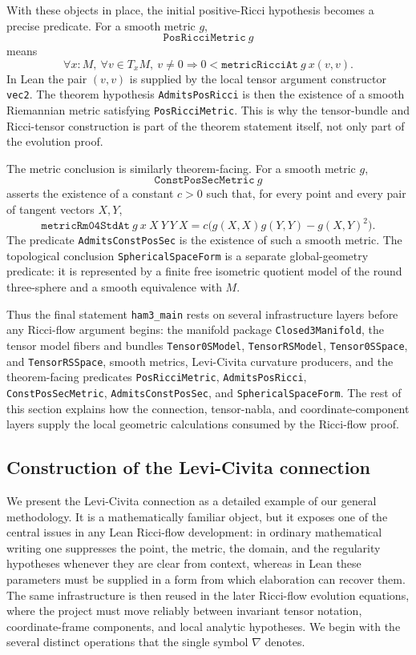 \documentclass[11pt]{article}
\theoremstyle{plain}
\theoremstyle{definition}
\theoremstyle{remark}
\newcommand{\leanref}[1]{\nolinkurl{#1}}
\begin{document}
With these objects in place, the initial positive-Ricci hypothesis becomes a
precise predicate.  For a smooth metric \(g\),
\[
  \mathtt{PosRicciMetric}\ g
\]
means
\[
  \forall x:M,\ \forall v\in T_xM,\ v\ne0
  \Longrightarrow
  0 <
  \mathtt{metricRicciAt}\ g\ x(v,v).
\]
In Lean the pair \((v,v)\) is supplied by the local tensor argument constructor
\leanref{vec2}.  The theorem hypothesis
\leanref{AdmitsPosRicci} is then the existence of a smooth Riemannian metric satisfying
\leanref{PosRicciMetric}.  This is why the tensor-bundle and Ricci-tensor
construction is part of the theorem statement itself, not only part of the
evolution proof.

The metric conclusion is similarly theorem-facing.  For a smooth metric \(g\),
\[
  \mathtt{ConstPosSecMetric}\ g
\]
asserts the existence of a constant \(c>0\) such that, for every point and every
pair of tangent vectors \(X,Y\),
\[
  \mathtt{metricRm04StdAt}\ g\ x\ X\ Y\ Y\ X
  =
  c\bigl(
      g(X,X)g(Y,Y)-g(X,Y)^2
    \bigr).
\]
The predicate \leanref{AdmitsConstPosSec} is the existence of such a smooth
metric.  The topological conclusion \leanref{SphericalSpaceForm} is a separate
global-geometry predicate: it is represented by a finite free isometric
quotient model of the round three-sphere and a smooth equivalence with \(M\).

Thus the final statement \leanref{ham3_main} rests on several infrastructure
layers before any Ricci-flow argument begins:
the manifold package \leanref{Closed3Manifold}, the tensor model fibers and
bundles \leanref{Tensor0SModel}, \leanref{TensorRSModel},
\leanref{Tensor0SSpace}, and \leanref{TensorRSSpace}, smooth metrics,
Levi-Civita curvature producers, and the theorem-facing predicates
\leanref{PosRicciMetric}, \leanref{AdmitsPosRicci},
\leanref{ConstPosSecMetric}, \leanref{AdmitsConstPosSec}, and
\leanref{SphericalSpaceForm}.  The rest of this section explains how the
connection, tensor-nabla, and coordinate-component layers supply the local
geometric calculations consumed by the Ricci-flow proof.

\subsection{Construction of the Levi-Civita connection}

We present the Levi-Civita connection as a detailed example of our general
methodology.  It is a mathematically familiar object, but it exposes one of the
central issues in any Lean Ricci-flow development: in ordinary mathematical
writing one suppresses the point, the metric, the domain, and the regularity
hypotheses whenever they are clear from context, whereas in Lean these
parameters must be supplied in a form from which elaboration can recover them.
The same infrastructure is then reused in the later Ricci-flow evolution
equations, where the project must move reliably between invariant tensor
notation, coordinate-frame components, and local analytic hypotheses.  We begin
with the several distinct operations that the single symbol $\nabla$ denotes.
\end{document}
